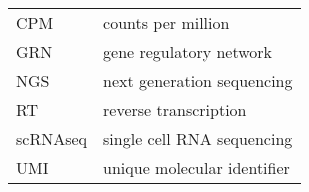 
\begin{tabular}{@{}ll@{}}
  CPM & counts per million \\
  GRN & gene regulatory network \\
  NGS & next generation sequencing \\
  RT & reverse transcription \\
  scRNAseq & single cell RNA sequencing \\
  UMI & unique molecular identifier \\
\end{tabular}

